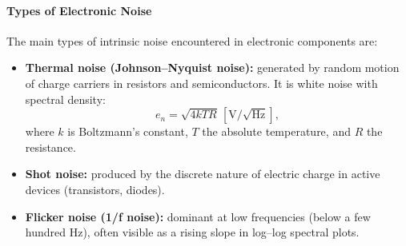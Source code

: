 \paragraph{Types of Electronic Noise}
The main types of intrinsic noise encountered in electronic components are:
\begin{itemize}
  \item \textbf{Thermal noise (Johnson–Nyquist noise):} generated by random motion of charge carriers in resistors and semiconductors.  
        It is white noise with spectral density:
        \[
        e_n = \sqrt{4 k T R}\,[\mathrm{V}/\sqrt{\mathrm{Hz}}],
        \]
        where \(k\) is Boltzmann’s constant, \(T\) the absolute temperature, and \(R\) the resistance.
  \item \textbf{Shot noise:} produced by the discrete nature of electric charge in active devices (transistors, diodes).
  \item \textbf{Flicker noise (1/f noise):} dominant at low frequencies (below a few hundred Hz), often visible as a rising slope in log–log spectral plots.
\end{itemize}

